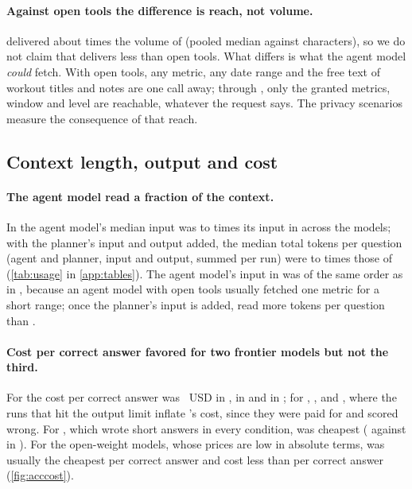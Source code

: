 \paragraph{Against open tools the difference is reach, not volume.} \CB{} delivered about \expRatioBC{} times the
volume of \CC{} (pooled median \expB{} against \expC{} characters), so we do not claim that \sys{} delivers less than
open tools. What
differs is what the agent model \emph{could} fetch. With open tools, any metric, any date range and the free text of
workout titles and notes are one call away; through \sys{}, only the granted metrics, window and level are reachable,
whatever the request says. The privacy scenarios measure the consequence of that reach.

\subsection{Context length, output and cost}\label{sec:res:efficiency}

\paragraph{The agent model read a fraction of the context.} In \CC{} the agent model's median input was
\ctxRatioCAMin{} to \ctxRatioCAMax{} times its input in \CA{} across the models; with the planner's
input and output added, the median total tokens per question (agent and planner, input and output, summed per run)
were \tokRatioCAMin{} to \tokRatioCAMax{} times those of \CA{}
(\cref{tab:usage} in \cref{app:tables}). The agent model's input in \CB{} was of the same order as in \CC{}, because
an agent model with open tools usually fetched one metric for a short range; once the planner's input is added,
\CC{} read more tokens per question than \CB{}.

\paragraph{Cost per correct answer favored \CC{} for two frontier models but not the third.} For
 the cost per correct answer was \cpcFableA{}~USD in \CA{}, \cpcFableB{} in \CB{} and
\cpcFableC{} in \CC{}; for , \cpcGeminiA{}, \cpcGeminiB{} and \cpcGeminiC{}, where the runs that hit the output limit
inflate \CA{}'s cost, since they were paid for and scored wrong. For
, which wrote short answers in every condition, \CA{} was cheapest (\cpcAstraA{} against
\cpcAstraC{} in \CC{}). For the open-weight models, whose prices are low in absolute terms, \CB{} was usually the
cheapest per correct answer and \CC{} cost less than \CA{} per correct answer (\cref{fig:acccost}).

